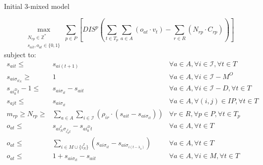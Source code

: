 \documentclass{beamer}
\begin{document}

\begin{frame}{Initial 3-mixed model}
\scriptsize

\begin{equation}
	\max_{\substack{N_{rp} \in \mathbb{Z}^* \\ 
	s_{ait}, o_{at} \in \{0, 1\}}} 
	\sum_{p \in P} [ DIS^p (\sum_{t\in T_p} \sum_{a \in A} (o_{at} \cdot v_t)  - \sum_{r\in R} (N_{rp} \cdot C_{rp})) ]
\end{equation}
subject to:
\begin{align}
s_{ait} \leq& s_{ai(t+1)}															& \forall a \in A, \forall i \in \mathcal{I}, \forall t \in T		\\
s_{ai\sigma_{it_N}} \geq& 1														& \forall a \in A, \forall i \in \mathcal{I} - M^O			\\
s_{ai^D_0t} - 1 \leq& s_{ai\sigma_{it}} - s_{ait}											& \forall a \in A, \forall i \in \mathcal{I} - D, \forall t \in T	\\
s_{ajt} \leq& s_{ai\sigma_{it}}														& \forall a \in A, \forall (i, j) \in IP, \forall t \in T 		\\
m_{rp} \geq N_{rp} \geq& \sum_{a\in A} \sum_{i\in \mathcal{I}} (\rho_{ir} \cdot (s_{ait} - s_{ai\sigma_{it}})) 		& \forall r \in R, \forall p \in P, \forall t \in T_p 			\\
o_{at} \leq& s_{ai^I_N\sigma_{i^I_Nt}} - s_{ai^D_0t}										& \forall a \in A, \forall t \in T					\\
o_{at} \leq& \sum_{i \in M \cup \{i^I_N\}} (s_{ai\sigma_{it}} - s_{ai\sigma_{i(t-\lambda_a)}})				& \forall a \in A, \forall t \in T					\\
o_{at} \leq& 1 + s_{ai\sigma_{it}} - s_{ait}												& \forall a \in A, \forall i \in M, \forall t \in T		
\end{align}

\end{frame}
\end{document}
